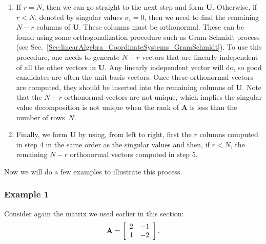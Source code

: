 \begin{enumerate}
\item If $r = N$, then we can go straight to the next step and form $\mathbf{U}$. Otherwise, if $r < N$, denoted by singular values $\sigma_i = 0$, then we need to find the remaining $N - r$ columns of $\mathbf{U}$. These columns must be orthonormal. These can be found using some orthogonalization procedure such as Gram-Schmidt process (see Sec.~\ref{Sec:linearAlgebra_CoordinateSystems_GramSchmidt}). To use this procedure, one needs to generate $N - r$ vectors that are linearly independent of all the other vectors in $\mathbf{U}$. Any linearly independent vector will do, so good candidates are often the unit basis vectors. Once these orthonormal vectors are computed, they should be inserted into the remaining columns of $\mathbf{U}$. Note that the $N - r$ orthonormal vectors are not unique, which implies the singular value decomposition is not unique when the rank of $\mathbf{A}$ is less than the number of rows~$N$.
\item Finally, we form $\mathbf{U}$ by using, from left to right, first the $r$ columns computed in step 4 in the same order as the singular values and then, if $r < N$, the remaining $N - r$ orthonormal vectors computed in step 5.
\end{enumerate}

Now we will do a few examples to illustrate this process.

\subsubsection{Example 1} 

Consider again the matrix we used earlier in this section:
\begin{align}
  \mathbf{A} = \left[ \begin{array}{c c}
   2 & -1 \\
   1 & -2 \\ \end{array} \right] .
\end{align}


